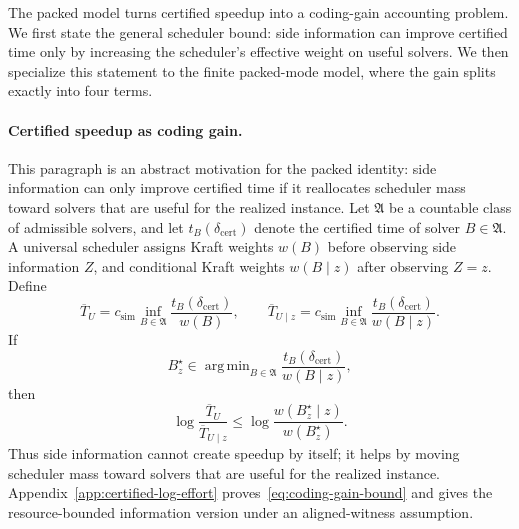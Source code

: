 \documentclass{article}
\newcommand{\newtext}[1]{\textcolor{green!50!black}{#1}}
\DeclareMathOperator*{\argmin}{arg\,min}
\begin{document}
The packed model turns certified speedup into a coding-gain accounting problem.
We first state the general scheduler bound: side information can improve certified time
only by increasing the scheduler's effective weight on useful solvers.  We then specialize
this statement to the finite packed-mode model, where the gain splits exactly into four terms.

\paragraph{Certified speedup as coding gain.}
\newtext{This paragraph is an abstract motivation for the packed identity: side information can only improve certified time if it reallocates scheduler mass toward solvers that are useful for the realized instance.}
Let \(\mathfrak A\) be a countable class of admissible solvers, and let
\(t_B(\delta_{\mathrm{cert}})\) denote the certified time of solver \(B\in\mathfrak A\).
A universal scheduler assigns Kraft weights \(w(B)\) before observing side information
\(Z\), and conditional Kraft weights \(w(B\mid z)\) after observing \(Z=z\).  Define
\[
    \overline T_U
    =
    c_{\mathrm{sim}}
    \inf_{B\in\mathfrak A}
    \frac{t_B(\delta_{\mathrm{cert}})}{w(B)},
    \qquad
    \overline T_{U\mid z}
    =
    c_{\mathrm{sim}}
    \inf_{B\in\mathfrak A}
    \frac{t_B(\delta_{\mathrm{cert}})}{w(B\mid z)} .
\]
If
\[
    B_z^\star
    \in
    \argmin_{B\in\mathfrak A}
    \frac{t_B(\delta_{\mathrm{cert}})}{w(B\mid z)},
\]
then
\begin{equation}
\label{eq:coding-gain-bound}
    \log\frac{\overline T_U}{\overline T_{U\mid z}}
    \le
    \log\frac{w(B_z^\star\mid z)}{w(B_z^\star)} .
\end{equation}
Thus side information cannot create speedup by itself; it helps by moving scheduler mass
toward solvers that are useful for the realized instance.  Appendix~\ref{app:certified-log-effort}
proves~\eqref{eq:coding-gain-bound} and gives the resource-bounded information version
under an aligned-witness assumption.
\end{document}
